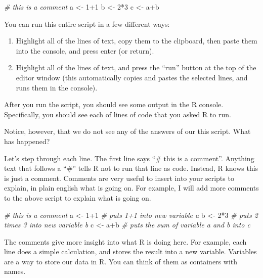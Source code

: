 \documentclass[]{book}
\newenvironment{Shaded}{\begin{snugshade}}{\end{snugshade}}
\newcommand{\DecValTok}[1]{\textcolor[rgb]{0.00,0.00,0.81}{{#1}}}
\newcommand{\StringTok}[1]{\textcolor[rgb]{0.31,0.60,0.02}{{#1}}}
\newcommand{\CommentTok}[1]{\textcolor[rgb]{0.56,0.35,0.01}{\textit{{#1}}}}
\newcommand{\NormalTok}[1]{{#1}}
\providecommand{\tightlist}{%
  \setlength{\itemsep}{0pt}\setlength{\parskip}{0pt}}
\theoremstyle{definition}
\theoremstyle{definition}
\theoremstyle{definition}
\theoremstyle{remark}
\begin{document}
\begin{Shaded}
\begin{Highlighting}[]
\CommentTok{# this is a comment}
\NormalTok{a <-}\StringTok{ }\DecValTok{1+1}
\NormalTok{b <-}\StringTok{ }\DecValTok{2}\NormalTok{*}\DecValTok{3}
\NormalTok{c <-}\StringTok{ }\NormalTok{a+b}
\end{Highlighting}
\end{Shaded}

You can run this entire script in a few different ways:

\begin{enumerate}
\def\labelenumi{\arabic{enumi}.}
\tightlist
\item
  Highlight all of the lines of text, copy them to the clipboard, then
  paste them into the console, and press enter (or return).
\item
  Highlight all of the lines of text, and press the ``run'' button at
  the top of the editor window (this automatically copies and pastes the
  selected lines, and runs them in the console).
\end{enumerate}

After you run the script, you should see some output in the R console.
Specifically, you should see each of lines of code that you asked R to
run.

Notice, however, that we do not see any of the answers of our this
script. What has happened?

Let's step through each line. The first line says ``\# this is a
comment''. Anything text that follows a ``\#'' tells R not to run that
line as code. Instead, R knows this is just a comment. Comments are very
useful to insert into your scripts to explain, in plain english what is
going on. For example, I will add more comments to the above script to
explain what is going on.

\begin{Shaded}
\begin{Highlighting}[]
\CommentTok{# this is a comment}
\NormalTok{a <-}\StringTok{ }\DecValTok{1+1} \CommentTok{# puts 1+1 into new variable a}
\NormalTok{b <-}\StringTok{ }\DecValTok{2}\NormalTok{*}\DecValTok{3} \CommentTok{# puts 2 times 3 into new variable b}
\NormalTok{c <-}\StringTok{ }\NormalTok{a+b }\CommentTok{# puts the sum of variable a and b into c}
\end{Highlighting}
\end{Shaded}

The comments give more insight into what R is doing here. For example,
each line does a simple calculation, and stores the result into a new
variable. Variables are a way to store our data in R. You can think of
them as containers with names.
\end{document}
